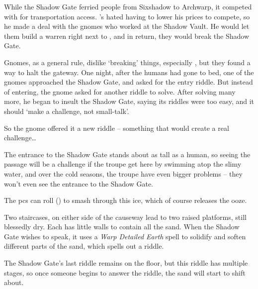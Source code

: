 \begin{multicols}{2}


\begin{exampletext}
  While the Shadow Gate ferried people from Sixshadow to Archwarp, it competed with  for transportation access.
  's  hated having to lower his prices to compete, so he made a deal with the gnomes who worked at the Shadow Vault.
  He would let them build a warren right next to , and in return, they would break the Shadow Gate.

  Gnomes, as a general rule, dislike `breaking' things, especially , but they found a way to halt the gateway.
  One night, after the humans had gone to bed, one of the gnomes approached the Shadow Gate, and asked for the entry riddle.
  But instead of entering, the gnome asked for another riddle to solve.
  After solving many more, he began to insult the Shadow Gate, saying its riddles were too easy, and it should `make a challenge, not small-talk'.

  So the gnome offered it a new riddle -- something that would create a real challenge\ldots
\end{exampletext}

The entrance to the Shadow Gate stands about as tall as a human, so seeing the passage will be a challenge if the troupe get here by swimming atop the slimy water, and over the cold seasons, the troupe have even bigger problems -- they won't even see the entrance to the Shadow Gate.

The \glspl{pc} can roll  (\tn[10]) to smash through this ice, which of course releases the ooze.

Two staircases, on either side of the causeway lead to two raised platforms, still blessedly dry.
Each has little walls to contain all the sand.
When the Shadow Gate wishes to speak, it uses a \textit{Warp Detailed Earth} spell to solidify and soften different parts of the sand, which spells out a riddle.

The Shadow Gate's last riddle remains on the floor, but this riddle has multiple stages, so once someone begins to answer the riddle, the sand will start to shift about.


\end{multicols}
